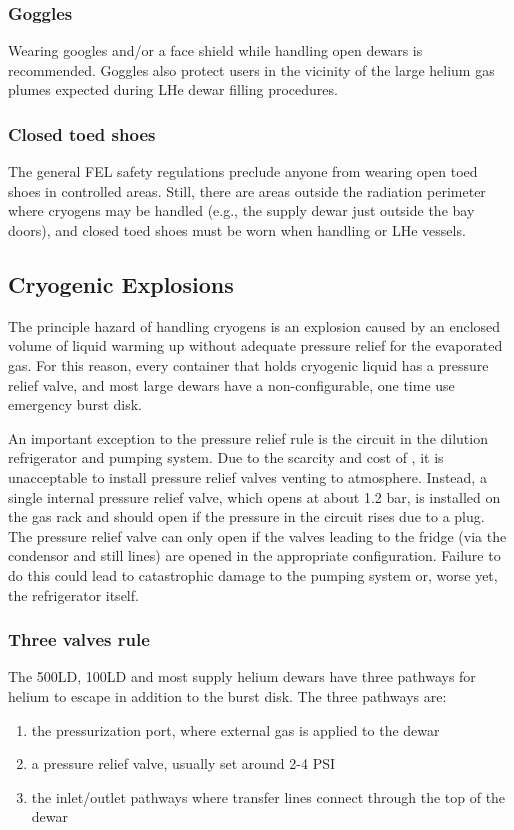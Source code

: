 \subsubsection{Goggles}
Wearing googles and/or a face shield while handling open \lnn{} dewars is recommended.  Goggles also protect users in the vicinity of the large helium gas plumes expected during LHe dewar filling procedures.

\subsubsection{Closed toed shoes}
The general FEL safety regulations preclude anyone from wearing open toed shoes in controlled areas.  Still, there are areas outside the radiation perimeter where cryogens may be handled (e.g., the supply dewar just outside the bay doors), and closed toed shoes must be worn when handling \lnn{} or LHe vessels.
 
\subsection{Cryogenic Explosions}
The principle hazard of handling cryogens is an explosion caused by an enclosed volume of liquid warming up without adequate pressure relief for the evaporated gas.  For this reason, every container that holds cryogenic liquid has a pressure relief valve, and most large dewars have a non-configurable, one time use emergency burst disk.  


An important exception to the pressure relief rule is the \het{} circuit in the dilution refrigerator and pumping system.  Due to the scarcity and cost of \het, it is unacceptable to install pressure relief valves venting to atmosphere.  Instead, a single internal pressure relief valve, which opens at about 1.2 bar, is installed on the \het gas rack and should open if the pressure in the circuit rises due to a plug.  The pressure relief valve can only open if the valves leading to the fridge (via the condensor and still lines) are opened in the appropriate configuration.  Failure to do this could lead to catastrophic damage to the pumping system or, worse yet, the refrigerator itself.  

\subsubsection{Three valves rule}

The 500LD, 100LD and most supply helium dewars have three pathways for helium to escape in addition to the burst disk.  The three pathways are:
\begin{enumerate}
\item the pressurization port, where external gas is applied to the dewar
\item a pressure relief valve, usually set around 2-4 PSI
\item the inlet/outlet pathways where transfer lines connect through the top of the dewar 
\end{enumerate}

